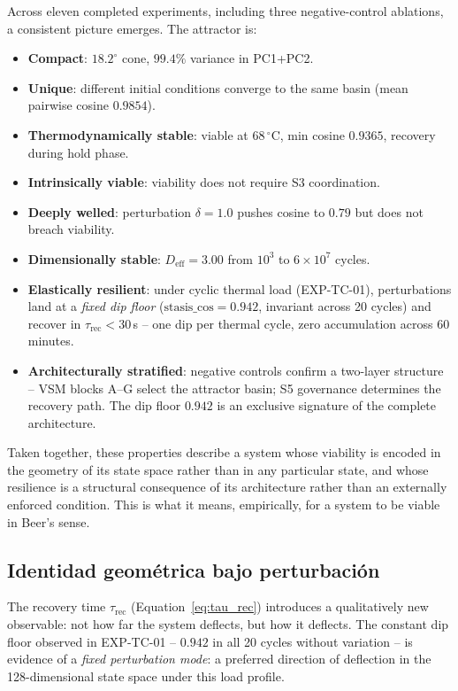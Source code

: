 \documentclass[11pt, a4paper]{article}
\begin{document}
Across eleven completed experiments, including three negative-control ablations,
a consistent picture emerges.
The attractor is:
\begin{itemize}
  \item \textbf{Compact}: $18.2^\circ$ cone, $99.4\%$ variance in PC1+PC2.
  \item \textbf{Unique}: different initial conditions converge to the same basin
        (mean pairwise cosine $0.9854$).
  \item \textbf{Thermodynamically stable}: viable at $68\,^\circ\mathrm{C}$,
        min cosine $0.9365$, recovery during hold phase.
  \item \textbf{Intrinsically viable}: viability does not require S3 coordination.
  \item \textbf{Deeply welled}: perturbation $\delta = 1.0$ pushes cosine to $0.79$
        but does not breach viability.
  \item \textbf{Dimensionally stable}: $D_\text{eff} = 3.00$ from $10^3$ to
        $6 \times 10^7$ cycles.
  \item \textbf{Elastically resilient}: under cyclic thermal load (EXP-TC-01),
        perturbations land at a \emph{fixed dip floor} ($\text{stasis\_cos} =
        0.942$, invariant across 20 cycles) and recover in
        $\tau_\text{rec} < 30$\,s -- one dip per thermal cycle, zero
        accumulation across 60 minutes.
  \item \textbf{Architecturally stratified}: negative controls confirm a two-layer
        structure -- VSM blocks A--G select the attractor basin; S5 governance
        determines the recovery path. The dip floor $0.942$ is an exclusive
        signature of the complete architecture.
\end{itemize}

Taken together, these properties describe a system whose viability is encoded
in the geometry of its state space rather than in any particular state, and
whose resilience is a structural consequence of its architecture rather than
an externally enforced condition.
This is what it means, empirically, for a system to be viable in Beer's sense.

\subsection{Identidad geométrica bajo perturbación}

The recovery time $\tau_\text{rec}$ (Equation~\ref{eq:tau_rec}) introduces a
qualitatively new observable: not how far the system deflects, but how it
deflects.  The constant dip floor observed in EXP-TC-01 -- $0.942$ in all 20
cycles without variation -- is evidence of a \emph{fixed perturbation mode}: a
preferred direction of deflection in the 128-dimensional state space under this
load profile.
\end{document}
